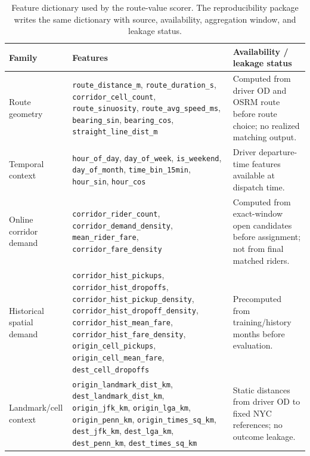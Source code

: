 \documentclass[journal]{IEEEtran}
\begin{document}
\begin{table}[!t]
\caption{Feature dictionary used by the route-value scorer. The reproducibility package writes the same dictionary with source, availability, aggregation window, and leakage status.}
\label{tab:feature_dictionary}
\centering
\scriptsize
\begin{tabularx}{\textwidth}{|L{0.16\textwidth}|L{0.65\textwidth}|Y|}
\hline
Family & Features & Availability / leakage status \\
\hline
Route geometry & \texttt{route\_distance\_m}, \texttt{route\_duration\_s}, \texttt{corridor\_cell\_count}, \texttt{route\_sinuosity}, \texttt{route\_avg\_speed\_ms}, \texttt{bearing\_sin}, \texttt{bearing\_cos}, \texttt{straight\_line\_dist\_m} & Computed from driver OD and OSRM route before route choice; no realized matching output. \\
\hline
Temporal context & \texttt{hour\_of\_day}, \texttt{day\_of\_week}, \texttt{is\_weekend}, \texttt{day\_of\_month}, \texttt{time\_bin\_15min}, \texttt{hour\_sin}, \texttt{hour\_cos} & Driver departure-time features available at dispatch time. \\
\hline
Online corridor demand & \texttt{corridor\_rider\_count}, \texttt{corridor\_demand\_density}, \texttt{mean\_rider\_fare}, \texttt{corridor\_fare\_density} & Computed from exact-window open candidates before assignment; not from final matched riders. \\
\hline
Historical spatial demand & \texttt{corridor\_hist\_pickups}, \texttt{corridor\_hist\_dropoffs}, \texttt{corridor\_hist\_pickup\_density}, \texttt{corridor\_hist\_dropoff\_density}, \texttt{corridor\_hist\_mean\_fare}, \texttt{corridor\_hist\_fare\_density}, \texttt{origin\_cell\_pickups}, \texttt{origin\_cell\_mean\_fare}, \texttt{dest\_cell\_dropoffs} & Precomputed from training/history months before evaluation. \\
\hline
Landmark/cell context & \texttt{origin\_landmark\_dist\_km}, \texttt{dest\_landmark\_dist\_km}, \texttt{origin\_jfk\_km}, \texttt{origin\_lga\_km}, \texttt{origin\_penn\_km}, \texttt{origin\_times\_sq\_km}, \texttt{dest\_jfk\_km}, \texttt{dest\_lga\_km}, \texttt{dest\_penn\_km}, \texttt{dest\_times\_sq\_km} & Static distances from driver OD to fixed NYC references; no outcome leakage. \\
\hline
\end{tabularx}
\end{table}
\end{document}
